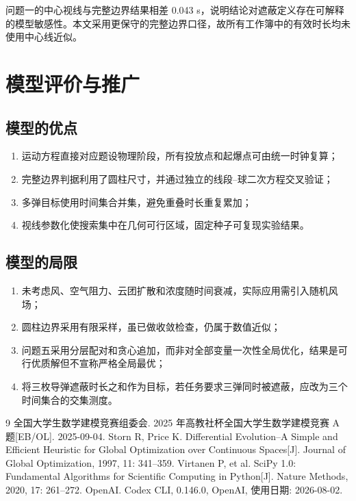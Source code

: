 \documentclass[12pt]{article}
\begin{document}
问题一的中心视线与完整边界结果相差 0.043 s，说明结论对遮蔽定义存在可解释的模型敏感性。本文采用更保守的完整边界口径，故所有工作簿中的有效时长均未使用中心线近似。

\section{模型评价与推广}

\subsection{模型的优点}
\begin{enumerate}
  \item 运动方程直接对应题设物理阶段，所有投放点和起爆点可由统一时钟复算；
  \item 完整边界判据利用了圆柱尺寸，并通过独立的线段--球二次方程交叉验证；
  \item 多弹目标使用时间集合并集，避免重叠时长重复累加；
  \item 视线参数化使搜索集中在几何可行区域，固定种子可复现实验结果。
\end{enumerate}

\subsection{模型的局限}
\begin{enumerate}
  \item 未考虑风、空气阻力、云团扩散和浓度随时间衰减，实际应用需引入随机风场；
  \item 圆柱边界采用有限采样，虽已做收敛检查，仍属于数值近似；
  \item 问题五采用分层配对和贪心追加，而非对全部变量一次性全局优化，结果是可行优质解但不宣称严格全局最优；
  \item 将三枚导弹遮蔽时长之和作为目标，若任务要求三弹同时被遮蔽，应改为三个时间集合的交集测度。
\end{enumerate}

\begin{thebibliography}{9}
 全国大学生数学建模竞赛组委会. 2025 年高教社杯全国大学生数学建模竞赛 A 题[EB/OL]. 2025-09-04.
 Storn R, Price K. Differential Evolution--A Simple and Efficient Heuristic for Global Optimization over Continuous Spaces[J]. Journal of Global Optimization, 1997, 11: 341--359.
 Virtanen P, et al. SciPy 1.0: Fundamental Algorithms for Scientific Computing in Python[J]. Nature Methods, 2020, 17: 261--272.
 OpenAI. Codex CLI, 0.146.0, OpenAI, 使用日期: 2026-08-02.
\end{thebibliography}
\end{document}
